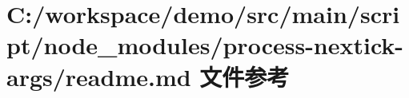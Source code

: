 \hypertarget{node__modules_2process-nextick-args_2_r_e_a_d_m_e_8md}{}\section{C\+:/workspace/demo/src/main/script/node\+\_\+modules/process-\/nextick-\/args/readme.md 文件参考}
\label{node__modules_2process-nextick-args_2_r_e_a_d_m_e_8md}
